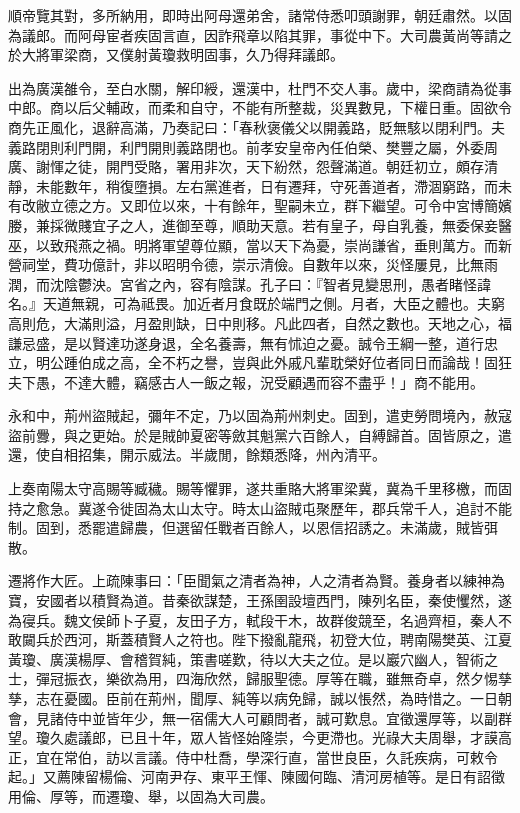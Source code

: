 \begin{pinyinscope}
順帝覽其對，多所納用，即時出阿母還弟舍，諸常侍悉叩頭謝罪，朝廷肅然。以固為議郎。而阿母宦者疾固言直，因詐飛章以陷其罪，事從中下。大司農黃尚等請之於大將軍梁商，又僕射黃瓊救明固事，久乃得拜議郎。

出為廣漢雒令，至白水關，解印綬，還漢中，杜門不交人事。歲中，梁商請為從事中郎。商以后父輔政，而柔和自守，不能有所整裁，災異數見，下權日重。固欲令商先正風化，退辭高滿，乃奏記曰：「春秋褒儀父以開義路，貶無駭以閉利門。夫義路閉則利門開，利門開則義路閉也。前孝安皇帝內任伯榮、樊豐之屬，外委周廣、謝惲之徒，開門受賂，署用非次，天下紛然，怨聲滿道。朝廷初立，頗存清靜，未能數年，稍復墮損。左右黨進者，日有遷拜，守死善道者，滯涸窮路，而未有改敝立德之方。又即位以來，十有餘年，聖嗣未立，群下繼望。可令中宮博簡嬪媵，兼採微賤宜子之人，進御至尊，順助天意。若有皇子，母自乳養，無委保妾醫巫，以致飛燕之禍。明將軍望尊位顯，當以天下為憂，崇尚謙省，垂則萬方。而新營祠堂，費功億計，非以昭明令德，崇示清儉。自數年以來，災怪屢見，比無雨潤，而沈陰鬱泱。宮省之內，容有陰謀。孔子曰：『智者見變思刑，愚者睹怪諱名。』天道無親，可為祗畏。加近者月食既於端門之側。月者，大臣之體也。夫窮高則危，大滿則溢，月盈則缺，日中則移。凡此四者，自然之數也。天地之心，福謙忌盛，是以賢達功遂身退，全名養壽，無有怵迫之憂。誠令王綱一整，道行忠立，明公踵伯成之高，全不朽之譽，豈與此外戚凡輩耽榮好位者同日而論哉！固狂夫下愚，不達大體，竊感古人一飯之報，況受顧遇而容不盡乎！」商不能用。

永和中，荊州盜賊起，彌年不定，乃以固為荊州刺史。固到，遣吏勞問境內，赦寇盜前釁，與之更始。於是賊帥夏密等斂其魁黨六百餘人，自縛歸首。固皆原之，遣還，使自相招集，開示威法。半歲閒，餘類悉降，州內清平。

上奏南陽太守高賜等臧穢。賜等懼罪，遂共重賂大將軍梁冀，冀為千里移檄，而固持之愈急。冀遂令徙固為太山太守。時太山盜賊屯聚歷年，郡兵常千人，追討不能制。固到，悉罷遣歸農，但選留任戰者百餘人，以恩信招誘之。未滿歲，賊皆弭散。

遷將作大匠。上疏陳事曰：「臣聞氣之清者為神，人之清者為賢。養身者以練神為寶，安國者以積賢為道。昔秦欲謀楚，王孫圉設壇西門，陳列名臣，秦使戄然，遂為寑兵。魏文侯師卜子夏，友田子方，軾段干木，故群俊競至，名過齊桓，秦人不敢闚兵於西河，斯蓋積賢人之符也。陛下撥亂龍飛，初登大位，聘南陽樊英、江夏黃瓊、廣漢楊厚、會稽賀純，策書嗟歎，待以大夫之位。是以巖穴幽人，智術之士，彈冠振衣，樂欲為用，四海欣然，歸服聖德。厚等在職，雖無奇卓，然夕惕孳孳，志在憂國。臣前在荊州，聞厚、純等以病免歸，誠以悵然，為時惜之。一日朝會，見諸侍中並皆年少，無一宿儒大人可顧問者，誠可歎息。宜徵還厚等，以副群望。瓊久處議郎，已且十年，眾人皆怪始隆崇，今更滯也。光祿大夫周舉，才謨高正，宜在常伯，訪以言議。侍中杜喬，學深行直，當世良臣，久託疾病，可敕令起。」又薦陳留楊倫、河南尹存、東平王惲、陳國何臨、清河房植等。是日有詔徵用倫、厚等，而遷瓊、舉，以固為大司農。


\end{pinyinscope}
